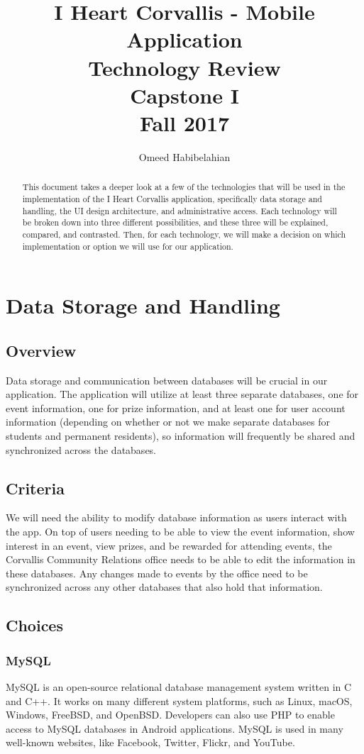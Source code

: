 \documentclass[draftclsnofoot, onecolumn, 10pt, compsoc]{IEEEtran}
\title{\textbf{I Heart Corvallis - Mobile Application\\Technology Review}\\Capstone I\\Fall 2017}
\author{Omeed Habibelahian}
\begin{document}
	\maketitle
	\begin{abstract}
		This document takes a deeper look at a few of the technologies that will be used in the implementation of the I Heart Corvallis application, specifically data storage and handling, the UI design architecture, and administrative access. Each technology will be broken down into three different possibilities, and these three will be explained, compared, and contrasted. Then, for each technology, we will make a decision on which implementation or option we will use for our application.
	\end{abstract}
	\newpage
	
	\section{Data Storage and Handling}
		\subsection{Overview}
			Data storage and communication between databases will be crucial in our application. The application will utilize at least three separate databases, one for event information, one for prize information, and at least one for user account information (depending on whether or not we make separate databases for students and permanent residents), so information will frequently be shared and synchronized across the databases.
		\subsection{Criteria}
			We will need the ability to modify database information as users interact with the app. On top of users needing to be able to view the event information, show interest in an event, view prizes, and be rewarded for attending events, the Corvallis Community Relations office needs to be able to edit the information in these databases. Any changes made to events by the office need to be synchronized across any other databases that also hold that information.
		
		\subsection{Choices}
			\subsubsection{\textbf{MySQL}}
				MySQL is an open-source relational database management system written in C and C++. It works on many different system platforms, such as Linux, macOS, Windows, FreeBSD, and OpenBSD. Developers can also use PHP to enable access to MySQL databases in Android applications. MySQL is used in many well-known websites, like Facebook, Twitter, Flickr, and YouTube.
				~\cite{wiki:MySQL}
				~\cite{MySQL_Android}			
\end{document}
